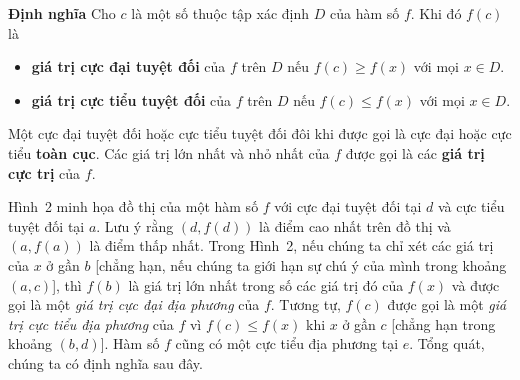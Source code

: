 \begin{minipage}[t]{131mm}
  \vspace{5pt}
  \begin{stewartbox}
  \noindent
  \hspace{6pt}%
  {\bfseries\sffamily\color{defred}\fontsize{10}{11}\selectfont Định nghĩa}\hspace{8pt}%
  Cho $c$ là một số thuộc tập xác định $D$ của hàm số $f$. Khi đó $f(c)$ là
  \begin{itemize}[leftmargin=1.5em, itemsep=2pt, topsep=3pt, parsep=0pt]
    \item[\textcolor{defred}{\textbullet}] \textbf{giá trị cực đại tuyệt đối} của $f$ trên $D$ nếu $f(c) \geqslant f(x)$ với mọi $x \in D$.
    \item[\textcolor{defred}{\textbullet}] \textbf{giá trị cực tiểu tuyệt đối} của $f$ trên $D$ nếu $f(c) \leqslant f(x)$ với mọi $x \in D$.
  \end{itemize}
  \end{stewartbox}

  \vspace{4pt}
  \noindent
  Một cực đại tuyệt đối hoặc cực tiểu tuyệt đối đôi khi được gọi là cực đại hoặc cực tiểu \textbf{toàn cục}. Các giá trị lớn nhất và nhỏ nhất của $f$ được gọi là các \textbf{giá trị cực trị} của $f$.

  Hình~2 minh họa đồ thị của một hàm số $f$ với cực đại tuyệt đối tại $d$ và cực tiểu tuyệt đối tại $a$. Lưu ý rằng $(d, f(d))$ là điểm cao nhất trên đồ thị và $(a, f(a))$ là điểm thấp nhất. Trong Hình~2, nếu chúng ta chỉ xét các giá trị của $x$ ở gần $b$ [chẳng hạn, nếu chúng ta giới hạn sự chú ý của mình trong khoảng $(a, c)$], thì $f(b)$ là giá trị lớn nhất trong số các giá trị đó của $f(x)$ và được gọi là một \emph{giá trị cực đại địa phương} của $f$. Tương tự, $f(c)$ được gọi là một \emph{giá trị cực tiểu địa phương} của $f$ vì $f(c) \leqslant f(x)$ khi $x$ ở gần $c$ [chẳng hạn trong khoảng $(b, d)$]. Hàm số $f$ cũng có một cực tiểu địa phương tại $e$. Tổng quát, chúng ta có định nghĩa sau đây.


\end{minipage}
